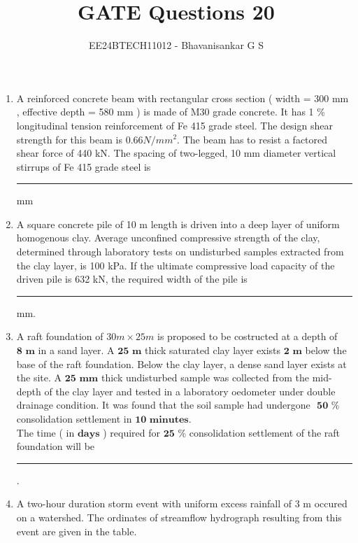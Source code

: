 \documentclass[journal]{IEEEtran}
\begin{document}

\vspace{3cm}

\title{GATE Questions 20}
\author{EE24BTECH11012 - Bhavanisankar G S}
{\let\newpage\relax\maketitle}
\begin{enumerate}
	\item A reinforced concrete beam with rectangular cross section ( width = 300 mm , effective depth = 580 mm ) is made of M30 grade concrete. It has 1 \% longitudinal tension reinforcement of Fe 415 grade steel. The design shear strength for this beam is $0.66 N/mm^2$. The beam has to resist a factored shear force of 440 kN. The spacing of two-legged, 10 mm diameter vertical stirrups of Fe 415 grade steel is \rule{1cm}{0.1pt} mm 
	\item A square concrete pile of 10 m length is driven into a deep layer of uniform homogenous clay. Average unconfined compressive strength of the clay, determined through laboratory tests on undisturbed samples extracted from the clay layer, is 100 kPa. If the ultimate compressive load capacity of the driven pile is 632 kN, the required width of the pile is \rule{1cm}{0.1pt} mm. 
	\item A raft foundation of \textbf{$30 m \times 25 m$} is proposed to be costructed at a depth of $\textbf{8 m}$ in a sand layer. A $\textbf{25 m}$ thick saturated clay layer exists $\textbf{2 m}$ below the base of the raft foundation. Below the clay layer, a dense sand layer exists at the site. A $\textbf{25 mm}$ thick undisturbed sample was collected from the mid-depth of the clay layer and tested in a laboratory oedometer under double drainage condition. It was found that the soil sample had undergone $\textbf{ 50 \%}$ consolidation settlement in $\textbf{10 minutes}$. \\
		The time ( in $\textbf{days}$ ) required for $\textbf{25 \%}$ consolidation settlement of the raft foundation will be \rule{1cm}{0.1pt}. 
	\item A two-hour duration storm event with uniform excess rainfall of 3 m occured on a watershed. The ordinates of streamflow hydrograph resulting from this event are given in the table. \\

\end{enumerate}
\end{document}
